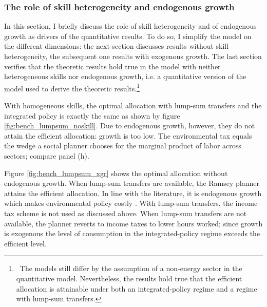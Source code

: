 \subsubsection{The role of skill heterogeneity and endogenous growth}\label{subsec:simpler}

In this section, I briefly discuss the role of skill heterogeneity and of endogenous growth as drivers of the quantitative results.
To do so, I simplify the model on the different dimensions: the next section discusses results without skill heterogeneity, the subsequent one results with exogenous growth. The last section verifies that the theoretic results hold true in the model with neither heterogeneous skills nor endogenous growth, i.e. a quantitative version of the model used to derive the theoretic results.\footnote{\ The models still differ by the assumption of a non-energy sector in the quantitative model. Nevertheless, the results hold true that the efficient allocation is attainable under both an integrated-policy regime and a regime with lump-sum transfers.} 

With homogeneous skills, the optimal allocation with lump-sum transfers and the integrated policy is exactly the same as shown by figure \ref{fig:bench_lumpsum_noskill}. Due to endogenous growth, however, they do not attain the efficient allocation: growth is too low. 
The environmental tax equals the wedge a social planner chooses for the marginal product of labor across sectors; compare panel (h). 

Figure \ref{fig:bench_lumpsum_xgr} shows the optimal allocation without endogenous growth. When lump-sum transfers are available, the Ramsey planner attains the efficient allocation. In line with the literature, it is endogenous growth which makes environmental policy costly \citep{Fried2018ClimateAnalysis, Acemoglu2012TheChange}. 
With lump-sum transfers, the income tax scheme is not used as discussed above. When lump-sum transfers are not available, the planner reverts to income taxes to lower hours worked; since growth is exogenous the level of consumption in the integrated-policy regime exceeds the efficient level.  



